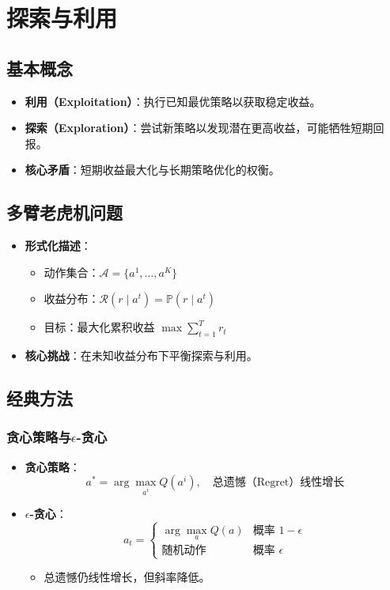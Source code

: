 

\section{探索与利用}
\subsection{基本概念}
\begin{itemize}
    \item \textbf{利用（Exploitation）}：执行已知最优策略以获取稳定收益。
    \item \textbf{探索（Exploration）}：尝试新策略以发现潜在更高收益，可能牺牲短期回报。
    \item \textbf{核心矛盾}：短期收益最大化与长期策略优化的权衡。
\end{itemize}

\subsection{多臂老虎机问题}
\begin{itemize}
    \item \textbf{形式化描述}：
        \begin{itemize}
            \item 动作集合：\( \mathcal{A} = \{a^1, \dots, a^K\} \)
            \item 收益分布：\( \mathcal{R}(r \mid a^t) = \mathbb{P}(r \mid a^t) \)
            \item 目标：最大化累积收益 \( \max \sum_{t=1}^T r_t \)
        \end{itemize}
    \item \textbf{核心挑战}：在未知收益分布下平衡探索与利用。
\end{itemize}

\subsection{经典方法}
\subsubsection{贪心策略与\(\epsilon\)-贪心}
\begin{itemize}
    \item \textbf{贪心策略}：
        \[
        a^* = \arg\max_{a^i} Q(a^i), \quad \text{总遗憾（Regret）线性增长}
        \]
    \item \textbf{\(\epsilon\)-贪心}：
        \[
        a_t = 
        \begin{cases}
            \arg\max_a Q(a) & \text{概率 } 1-\epsilon \\
            \text{随机动作} & \text{概率 } \epsilon
        \end{cases}
        \]
        \begin{itemize}
            \item 总遗憾仍线性增长，但斜率降低。
        \end{itemize}
\end{itemize}

